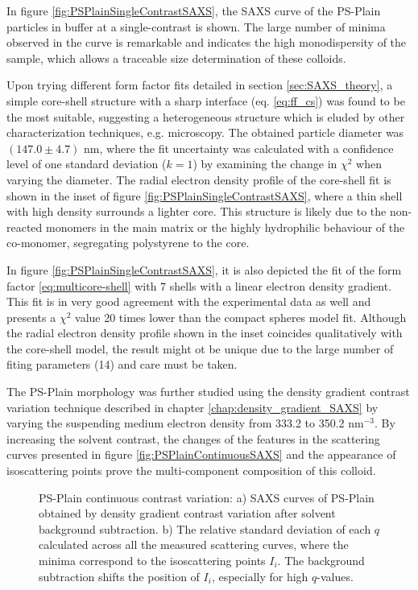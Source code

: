 In figure \ref{fig:PSPlainSingleContrastSAXS}, the SAXS curve of the  PS-Plain particles in buffer at a single-contrast is shown. The large number of minima observed in the curve is remarkable and indicates the high monodispersity of the sample, which allows a traceable size determination of these colloids.

Upon trying different form factor fits detailed in section \ref{sec:SAXS_theory}, a simple core-shell structure with a sharp interface (eq. \ref{eq:ff_cs}) was found to be the most suitable, suggesting a heterogeneous structure which is eluded by other characterization techniques, e.g. microscopy. The obtained particle diameter was $(147.0\pm4.7)$ nm, where the fit uncertainty was calculated with a confidence level of one standard deviation ($k=1$) by examining the change in $\chi^2$ when varying the diameter. The radial electron density profile of the core-shell fit is shown in the inset of figure \ref{fig:PSPlainSingleContrastSAXS}, where a thin shell with high density surrounds a lighter core. This structure is likely due to the non-reacted monomers in the main matrix or the highly hydrophilic behaviour of the co-monomer, segregating polystyrene to the core.

In figure \ref{fig:PSPlainSingleContrastSAXS}, it is also depicted the fit of the form factor \ref{eq:multicore-shell} with 7 shells with a linear electron density gradient. This fit is in very good agreement with the experimental data as well and presents a $\chi^2$ value 20 times lower than the compact spheres model fit. Although the radial electron density profile shown in the inset coincides qualitatively with the core-shell model, the result might ot be unique due to the large number of fiting parameters (14) and care must be taken.

The PS-Plain morphology was further studied using the density gradient contrast variation technique described in chapter \ref{chap:density_gradient_SAXS} by varying the suspending medium electron density from 333.2 to 350.2 nm$^{-3}$. By increasing the solvent contrast, the changes of the features in the scattering curves presented in figure \ref{fig:PSPlainContinuousSAXS} and the appearance of isoscattering points prove the multi-component composition of this colloid.

\begin{figure}%
	\centering
	\caption[Continuous contrast variation experimental data of the PS-Plain particles.]{PS-Plain continuous contrast variation: a) SAXS curves of PS-Plain obtained by density gradient contrast variation after solvent background subtraction. b) The relative standard deviation of each $q$ calculated across all the measured scattering curves, where the minima correspond to the isoscattering points $I_i$. The background subtraction shifts the position of $I_i$, especially for high $q$-values.}
\end{figure}

